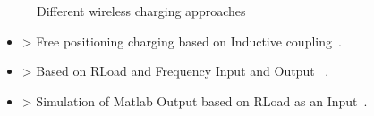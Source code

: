 \begin{frame}
\begin{figure}
{\begin{subfigure}[b]{0.3\textwidth}
                \label{fig:multiple}
        \end{subfigure}%
        }
        \caption{Different wireless charging approaches~\label{fig:animals}~\cite{wsn}}
  \end{figure}
  \begin{itemize}[<+->]
      \item<1-| alert@1>> Free positioning charging based on Inductive coupling~\cite{wireless}.
      \item<2-| alert@2>> Based on RLoad and Frequency Input and Output ~\cite{wireless}. %
      \item<3-| alert@3>> Simulation of Matlab Output based on RLoad as an Input~\cite{wireless}. %
    \end{itemize} 
\end{frame}
